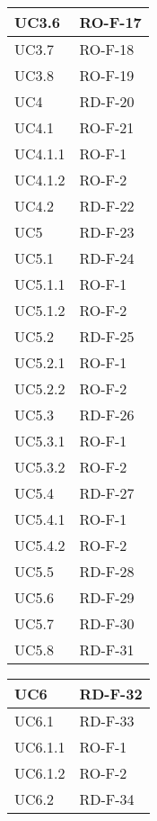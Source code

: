 \begin{center}
\begin{tabular}{ |m{8em}|m{13em}| }
    \hline
    UC3.6       &   RO-F-17 \\
    \hline
    UC3.7       &   RO-F-18 \\
    \hline
    UC3.8       &   RO-F-19 \\
    \hline
    UC4         &   RD-F-20 \\
    \hline
    UC4.1       &   RO-F-21 \\
    \hline
    UC4.1.1     &   RO-F-1 \\
    \hline
    UC4.1.2     &   RO-F-2 \\
    \hline
    UC4.2       &   RD-F-22 \\
    \hline
    UC5         &   RD-F-23 \\
    \hline
    UC5.1       &   RD-F-24 \\
    \hline
    UC5.1.1     &   RO-F-1 \\
    \hline
    UC5.1.2     &   RO-F-2 \\
    \hline
    UC5.2       &   RD-F-25 \\
    \hline
    UC5.2.1     &   RO-F-1 \\
    \hline
    UC5.2.2     &   RO-F-2 \\
    \hline
    UC5.3       &   RD-F-26 \\
    \hline
    UC5.3.1     &   RO-F-1 \\
    \hline
    UC5.3.2     &   RO-F-2 \\
    \hline
    UC5.4       &   RD-F-27 \\
    \hline
    UC5.4.1     &   RO-F-1 \\
    \hline
    UC5.4.2     &   RO-F-2 \\
    \hline
    UC5.5       &   RD-F-28 \\
    \hline
    UC5.6       &   RD-F-29 \\
    \hline
    UC5.7       &   RD-F-30 \\
    \hline
    UC5.8       &   RD-F-31 \\
    \hline
    \end{tabular}
    \newpage
    \begin{tabular}{ |m{8em}|m{13em}| }
    \hline
    UC6         &   RD-F-32 \\
    \hline
    UC6.1       &   RD-F-33 \\
    \hline
    UC6.1.1     &   RO-F-1 \\
    \hline
    UC6.1.2     &   RO-F-2 \\
    \hline
    UC6.2       &   RD-F-34 \\

\end{tabular}
\end{center}
